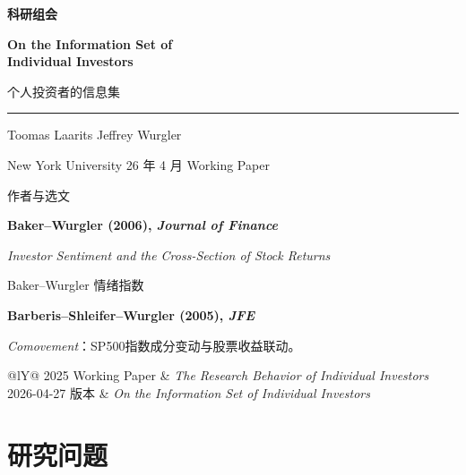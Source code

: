 \begin{frame}[plain]
  \vfill
  {\small\color{wine}\bfseries 科研组会\par}
  \vspace{5mm}
  {\fontsize{22}{26}\selectfont\bfseries On the Information Set of\\Individual Investors\par}
  \vspace{3mm}
  {\large\color{wine}个人投资者的信息集\par}
  \vspace{3mm}
  {\color{wine}\rule{.95\linewidth}{.75pt}}\par\medskip
  Toomas Laarits \quad Jeffrey Wurgler\par
  {\small New York University \hfill 26 年 4 月 Working Paper}\par
  \vspace{4mm}{\small 汇报人：杨博远\quad 27国金博0}\vfill
\end{frame}

\begin{frame}[label=authors]{作者与选文}
  \smallskip
  {\small
  \textbf{Baker--Wurgler (2006), \textit{Journal of Finance}}\par
  \textit{Investor Sentiment and the Cross-Section of Stock Returns}\par
  Baker--Wurgler 情绪指数\par\smallskip
  \textbf{Barberis--Shleifer--Wurgler (2005), \textit{JFE}}\par
  \textit{Comovement}：SP500指数成分变动与股票收益联动。\par}
  \smallskip
  \smallskip\small
  \begin{tabularx}{\linewidth}{@{}lY@{}}
    2025 Working Paper & \textit{The Research Behavior of Individual Investors}\\
    2026-04-27 版本 & \textit{On the Information Set of Individual Investors}
  \end{tabularx}
\end{frame}

\section{研究问题}

